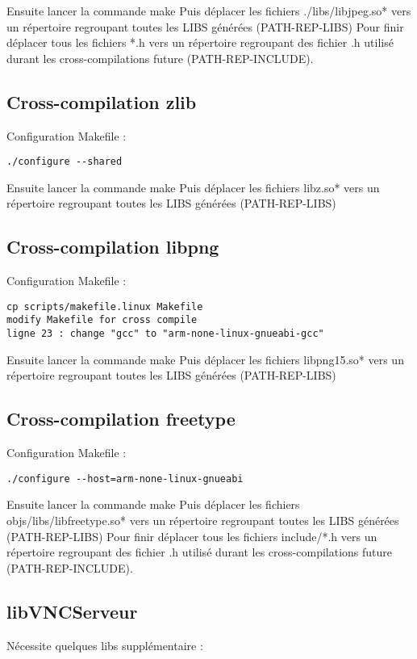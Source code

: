 Ensuite lancer la commande make
Puis déplacer les fichiers ./libs/libjpeg.so* vers un répertoire regroupant toutes les LIBS générées (PATH-REP-LIBS)
Pour finir déplacer tous les fichiers *.h vers un répertoire regroupant des fichier .h utilisé durant les cross-compilations future (PATH-REP-INCLUDE).

\subsection{Cross-compilation zlib}
Configuration Makefile :

\begin{lstlisting}
./configure --shared
\end{lstlisting}

Ensuite lancer la commande make
Puis déplacer les fichiers libz.so* vers un répertoire regroupant toutes les LIBS générées (PATH-REP-LIBS)

\subsection{Cross-compilation libpng}
Configuration Makefile :

\begin{lstlisting}
cp scripts/makefile.linux Makefile
modify Makefile for cross compile
ligne 23 : change "gcc" to "arm-none-linux-gnueabi-gcc"
\end{lstlisting}

Ensuite lancer la commande make
Puis déplacer les fichiers libpng15.so* vers un répertoire regroupant toutes les LIBS générées (PATH-REP-LIBS)

\subsection{Cross-compilation freetype}
Configuration Makefile :

\begin{lstlisting}
./configure --host=arm-none-linux-gnueabi
\end{lstlisting}

Ensuite lancer la commande make
Puis déplacer les fichiers objs/libs/libfreetype.so* vers un répertoire regroupant toutes les LIBS générées (PATH-REP-LIBS)
Pour finir déplacer tous les fichiers include/*.h vers un répertoire regroupant des fichier .h utilisé durant les cross-compilations future (PATH-REP-INCLUDE).

\subsection{libVNCServeur}
Nécessite quelques libs supplémentaire :

